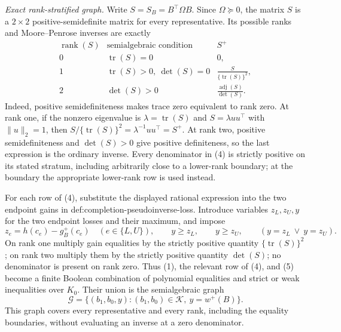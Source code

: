 \emph{Exact rank-stratified graph.}
Write \(S=S_B=B^{\top}\Omega B\).  Since \(\Omega\succeq0\), the matrix \(S\) is a \(2\times2\) positive-semidefinite matrix for every representative.  Its possible ranks and Moore--Penrose inverses are exactly
\[
\begin{array}{c|c|c}
\operatorname{rank}(S)&\text{semialgebraic condition}&S^+\\ \hline
0&\operatorname{tr}(S)=0&0,\\[2mm]
1&\operatorname{tr}(S)>0,\ \det(S)=0&
\displaystyle\frac{S}{\{\operatorname{tr}(S)\}^2},\\[3mm]
2&\det(S)>0&
\displaystyle\frac{\operatorname{adj}(S)}{\det(S)}.
\end{array}
\tag{4}
\]
Indeed, positive semidefiniteness makes trace zero equivalent to rank zero.  At rank one, if the nonzero eigenvalue is \(\lambda=\operatorname{tr}(S)\) and \(S=\lambda uu^{\top}\) with \(\lVert u\rVert_2=1\), then \(S/\{\operatorname{tr}(S)\}^2=\lambda^{-1}uu^{\top}=S^+\).  At rank two, positive semidefiniteness and \(\det(S)>0\) give positive definiteness, so the last expression is the ordinary inverse.  Every denominator in (4) is strictly positive on its stated stratum, including arbitrarily close to a lower-rank boundary; at the boundary the appropriate lower-rank row is used instead.

For each row of (4), substitute the displayed rational expression into the two endpoint gains in def:completion-pseudoinverse-loss.  Introduce variables \(z_L,z_U,y\) for the two endpoint losses and their maximum, and impose
\[
 z_e=h(c_e)-g_B^+(c_e)\quad(e\in\{L,U\}),
 \qquad y\ge z_L,\qquad y\ge z_U,
 \qquad (y=z_L\ \vee\ y=z_U).
\tag{5}
\]
On rank one multiply gain equalities by the strictly positive quantity \(\{\operatorname{tr}(S)\}^2\); on rank two multiply them by the strictly positive quantity \(\det(S)\); no denominator is present on rank zero.  Thus (1), the relevant row of (4), and (5) become a finite Boolean combination of polynomial equalities and strict or weak inequalities over \(K_0\).  Their union is the semialgebraic graph
\[
 \mathcal G
 =\{(b_1,b_0,y):(b_1,b_0)\in\mathcal K,\ y=w^+(B)\}.
\tag{6}
\]
This graph covers every representative and every rank, including the equality boundaries, without evaluating an inverse at a zero denominator.

